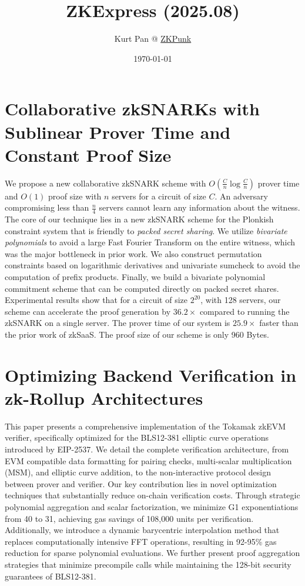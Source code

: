 \documentclass[11pt]{article}
\theoremstyle{definition}
\theoremstyle{remark}
\theoremstyle{plain}
\begin{document}
\title{ZKExpress (2025.08)}
\author{Kurt Pan @ \href{https://zkpunk.pro}{ZKPunk}}
\date{\today}
\maketitle
\tableofcontents

\section{\cite{cryptoeprint:2025/1388} Collaborative zkSNARKs with Sublinear Prover Time and Constant Proof Size}
We propose a new collaborative zkSNARK scheme with $O\left(\frac{C}{n} \log \frac{C}{n}\right)$ prover time and $O(1)$ proof size with $n$ servers for a circuit of size $C$. 
An adversary compromising less than $\frac{n}{4}$ servers cannot learn any information about the witness. 
The core of our technique lies in a new zkSNARK scheme for the Plonkish constraint system that is friendly to \emph{packed secret sharing}. We utilize \emph{bivariate polynomials} to avoid a large Fast Fourier Transform on the entire witness, which was the major bottleneck in prior work. We also construct permutation constraints based on logarithmic derivatives and univariate sumcheck to avoid the computation of prefix products. Finally, we build a bivariate polynomial commitment scheme that can be computed directly on packed secret shares.
Experimental results show that for a circuit of size $2^{20}$, with 128 servers, our scheme can accelerate the proof generation by $36.2 \times$ compared to running the zkSNARK on a single server. The prover time of our system is $25.9 \times$ faster than the prior work of zkSaaS. The proof size of our scheme is only 960 Bytes.

\section{\cite{cryptoeprint:2025/1390} Optimizing Backend Verification in zk-Rollup Architectures}
This paper presents a comprehensive implementation of the Tokamak zkEVM verifier, specifically optimized for the BLS12-381 elliptic curve operations introduced by EIP-2537. We detail the complete verification architecture, from EVM compatible data formatting for pairing checks, multi-scalar multiplication (MSM), and elliptic curve addition, to the non-interactive protocol design between prover and verifier.
Our key contribution lies in novel optimization techniques that substantially reduce on-chain verification costs. 
Through strategic polynomial aggregation and scalar factorization, we minimize G1 exponentiations from 40 to 31, achieving gas savings of 108,000 units per verification. 
Additionally, we introduce a dynamic barycentric interpolation method that replaces computationally intensive FFT operations,
resulting in 92-95\% gas reduction for sparse polynomial evaluations. We further present proof aggregation strategies that minimize precompile calls while maintaining the 128-bit security guarantees of BLS12-381.
\end{document}
